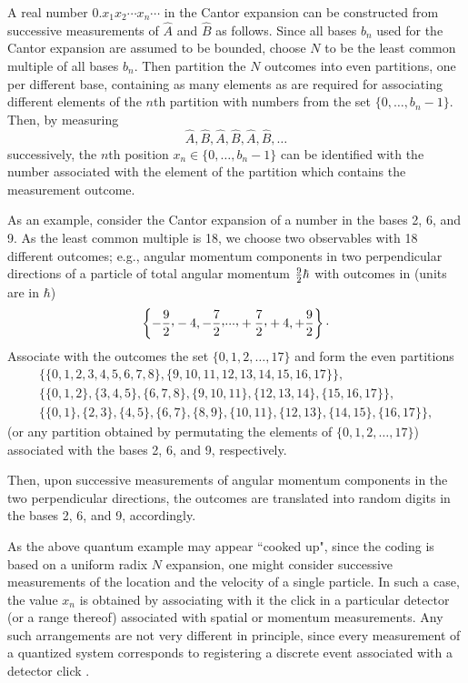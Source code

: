 \documentclass[11pt,a4paper,twoside]{article}
\begin{document}
A real number $0.x_1x_2\cdots x_n \cdots $ in the Cantor expansion
can be constructed from successive  measurements of $\hat{A}$
and $\hat{B}$ as follows.
Since all bases $b_n$ used for the Cantor
expansion are assumed to be bounded, choose $N$ to be
the least common multiple of all bases $b_n$.
Then partition the $N$ outcomes into even partitions,
one per different base,
containing as many elements as are required for
associating different elements of the $n$th partition
with  numbers from the set  $\{0,\ldots ,b_n-1\}$.
Then, by measuring
$$\hat{A},\hat{B},\hat{A},\hat{B},\hat{A},\hat{B},\ldots$$
successively, the $n$th position  $x_n \in \{0,\ldots ,b_n-1\}$
can be identified
with the number associated with the element of the partition which
contains the measurement outcome.

As an example, consider the Cantor expansion of a number in the bases
 2, 6, and 9. As the  least common multiple is 18, we choose two
observables with 18 different outcomes; e.g., angular momentum
components in two perpendicular directions of a particle of total
angular
momentum  ${9\over 2} \hbar$ with outcomes in  (units are in $\hbar$)
$$\left\{ -{9\over 2} \raisebox{.4ex}{,}-4,-{7\over 2}
\raisebox{.4ex}{,}
\raisebox{.4ex}{.}\raisebox{.4ex}{.}\raisebox{.4ex}{.,} +{7\over 2} \raisebox{.4ex}{,} +4,+{9\over
2}\right\} \raisebox{.4ex}{.}$$
Associate with the outcomes the set
$\{0,1,2,\ldots ,17\}$
and form the even partitions
\begin{eqnarray}
&\{\{0,1,2,3,4,5,6,7,8\},\{9,10,11,12,13,14,15,16,17\}\},&\nonumber  \\
&\{\{0,1,2\},\{3,4,5\},\{6,7,8\},\{9,10,11\},\{12,13,14\},\{15,16,17\}\},&\nonumber  \\
&\{\{0,1\},\{2,3\},\{4,5\},\{6,7\},\{8,9\},\{10,11\},\{12,13\},\{14,15\},\{1
6,17\}\},&\nonumber
\end{eqnarray}
(or any partition obtained by permutating the elements of $\{0,1,2,\ldots
,17\}$)
associated with the bases  2, 6, and 9, respectively.

Then, upon successive measurements of angular momentum
components in the two perpendicular directions,
the outcomes  are translated into random digits in the bases  2, 6, and 9,
accordingly.


As the above quantum example may appear   ``cooked up",  since  the
coding is based on a uniform radix $N$ expansion, one
might consider successive measurements of the location and the velocity of
a single particle. In such a case, the value $x_n$ is obtained by
associating with it
the click in a particular detector (or a range thereof) associated with
spatial or momentum measurements. Any such arrangements are not very
different in principle, since every measurement of a quantized system
corresponds to registering a discrete event associated with a detector
click \cite{sum-4}.
\end{document}
